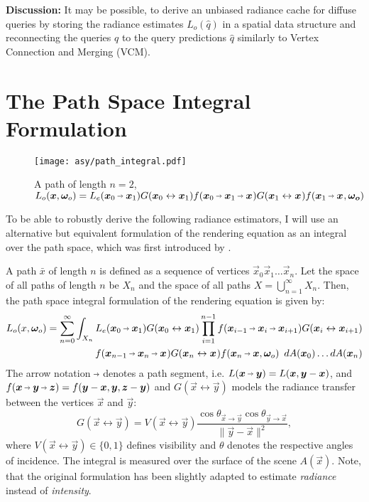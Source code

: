 \textbf{Discussion:} It may be possible, to derive an unbiased radiance cache for diffuse queries by storing the radiance estimates $L_o(\hat{q})$ in a spatial data structure and reconnecting the queries $q$ to the query predictions $\hat{q}$ similarly to Vertex Connection and Merging (VCM). %

\section{The Path Space Integral Formulation}
\begin{figure}[ht]
    \centering
    \texttt{[image: asy/path\_integral.pdf]}
\caption{A path of length $n=2$, $L_o(\vec{x}, \wo) = L_e(\pdir{0}{1}) \G{0}{1} \f{0}{1}{} \G{1}{} f(\pdir{1}{}, \vec{\omega_o})$}
\end{figure}
To be able to robustly derive the following radiance estimators, I will use an alternative but equivalent formulation of the rendering equation as an integral over the path space, which was first introduced by \textcite{veach1997}.

A path $\bar{x}$ of length $n$ is defined as a sequence of vertices $\vec{x}_0 \vec{x}_1 \dots \vec{x}_n$.
Let the space of all paths of length $n$ be $X_n$ and the space of all paths $X = \bigcup_{n=1}^{\infty} X_n$.
Then, the path space integral formulation of the rendering equation is given by:
\begin{equation}
\label{eq:path_space_integral}
\begin{aligned}
    L_o(x, \wo) = \sum_{n=0}^{\infty} \int_{X_n} L_e(\pdir{0}{1}) \G{0}{1} \prod_{i=1}^{n - 1} \f{i-1}{i}{i+1} \G{i}{i+1}\\
    \f{n-1}{n}{} \G{n}{} f(\vec{x}_n \pto \vec{x}, \wo) \ \diff A(\vec{x}_0) \dots \diff A(\vec{x}_n)
\end{aligned}
\end{equation}
The arrow notation $\pto$ denotes a path segment, i.e. $L(\vec{x} \pto \vec{y})=L(\vec{x}, \vec{y} - \vec{x})$, and $f(\vec{x} \pto \vec{y} \pto \vec{z})=f(\vec{y} - \vec{x}, \vec{y}, \vec{z} - \vec{y})$ and $G(\vec{x} \leftrightarrow \vec{y})$ models the radiance transfer between the vertices $\vec{x}$ and $\vec{y}$:
\begin{equation}
\label{eq:transfer}
G(\vec{x} \leftrightarrow \vec{y}) = V(\vec{x} \leftrightarrow \vec{y}) \frac{\cos \theta_{\vec{x} \to \vec{y}} \cos \theta_{\vec{y} \to \vec{x}}}{\|\vec{y} - \vec{x}\|^2},
\end{equation}
where $V(\vec{x} \leftrightarrow \vec{y}) \in \{0,1\}$ defines visibility and $\theta$ denotes the respective angles of incidence.
The integral is measured over the surface of the scene $A(\vec{x})$.
Note, that the original formulation has been slightly adapted to estimate \emph{radiance} instead of \emph{intensity}.

